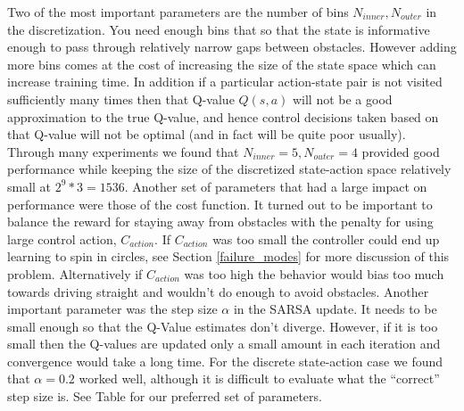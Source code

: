 \documentclass{article}
\begin{document}
Two of the most important parameters are the number of bins $N_{inner}, N_{outer}$ in the discretization. You need enough bins that so that the state is informative enough to pass through relatively narrow gaps between obstacles. However adding more bins comes at the cost of increasing the size of the state space which can increase training time. In addition if a particular action-state pair is not visited sufficiently many times then that Q-value $Q(s,a)$ will not be a good approximation to the true Q-value, and hence control decisions taken based on that Q-value will not be optimal (and in fact will be quite poor usually). Through many experiments we found that $N_{inner} = 5, N_{outer} = 4$ provided good performance while keeping the size of the discretized state-action space relatively small at $2^9 * 3 = 1536$. Another set of parameters that had a large impact on performance were those of the cost function. It turned out to be important to balance the reward for staying away from obstacles with the penalty for using large control action, $C_{action}$. If $C_{action}$ was too small the controller could end up learning to spin in circles, see Section \ref{failure_modes} for more discussion of this problem. Alternatively if $C_{action}$ was too high the behavior would bias too much towards driving straight and wouldn't do enough to avoid obstacles. Another important parameter was the step size $\alpha$ in the SARSA update. It needs to be small enough so that the Q-Value estimates don't diverge. However, if it is too small then the Q-values are updated only a small amount in each iteration and convergence would take a long time. For the discrete state-action case we found that $\alpha = 0.2$ worked well, although it is difficult to evaluate what the ``correct'' step size is. See Table  for our preferred set of parameters.
\end{document}
